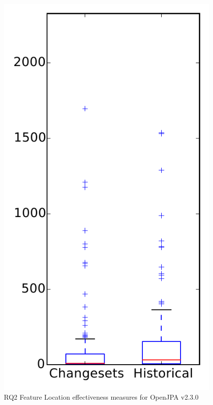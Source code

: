 
\begin{figure}
\centering
\includegraphics[height=0.4\textheight]{figures/flt/rq2_openjpa}
\caption{RQ2 Feature Location effectiveness measures for OpenJPA v2.3.0}
\label{fig:flt:rq2:openjpa}
\end{figure}
